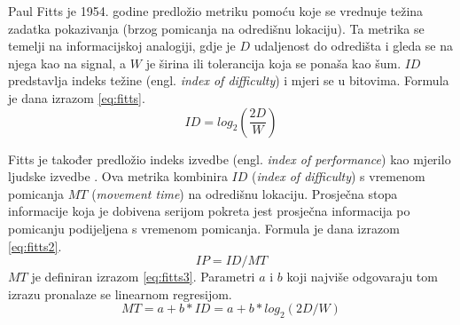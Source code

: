 \documentclass[times, utf8, zavrsni, numeric]{fer}
\begin{document}
Paul Fitts je 1954. godine predložio metriku pomoću koje se vrednuje težina zadatka pokazivanja (brzog pomicanja na odredišnu lokaciju). Ta metrika se temelji na informacijskoj analogiji, gdje je $D$ udaljenost do odredišta i gleda se na njega kao na signal, a $W$ je širina ili tolerancija koja se ponaša kao šum. $ID$ predstavlja indeks težine (engl. \emph{index of difficulty}) i mjeri se u bitovima. Formula je dana izrazom \ref{eq:fitts}.
\begin{equation}
\label{eq:fitts}
ID = log_2(\frac{2D}{W})
\end{equation}

Fitts je također predložio indeks izvedbe (engl. \emph{index of performance}) kao mjerilo ljudske izvedbe . Ova metrika kombinira $ID$ (\emph{index of difficulty}) s vremenom pomicanja $MT$ (\emph{movement time}) na odredišnu lokaciju. Prosječna stopa informacije koja je dobivena serijom pokreta jest prosječna informacija po pomicanju podijeljena s vremenom pomicanja. Formula je dana izrazom \ref{eq:fitts2}.
\begin{equation}
\label{eq:fitts2}
IP = ID/MT
\end{equation}
$MT$ je definiran izrazom \ref{eq:fitts3}. Parametri $a$ i $b$ koji najviše odgovaraju tom izrazu pronalaze se linearnom regresijom.
\begin{equation}
\label{eq:fitts3}
MT = a+b*ID = a+b*log_2(2D/W)
\end{equation}
\end{document}
